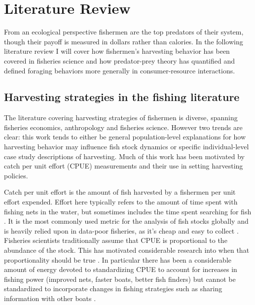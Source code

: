 \documentclass[12pt,a4paper]{report}
\begin{document}
\tableofcontents

\chapter{Literature Review}
From an ecological perspective fishermen are the top predators of their system, though their payoff is measured in dollars rather than calories. In the following literature review I will cover how fishermen's harvesting behavior has been covered in fisheries science and how predator-prey theory has quantified and defined foraging behaviors more generally in consumer-resource interactions. 

\section{Harvesting strategies in the fishing literature}
The literature covering harvesting strategies of fishermen is diverse, spanning fisheries economics, anthropology and fisheries science. However two trends are clear: this work tends to either be general population-level explanations for how harvesting behavior may influence fish stock dynamics or specific individual-level case study descriptions of harvesting. Much of this work has been motivated by catch per unit effort (CPUE) measurements and their use in setting harvesting policies. 

Catch per unit effort is the amount of fish harvested by a fishermen per unit effort expended. Effort here typically refers to the amount of time spent with fishing nets in the water, but sometimes includes the time spent searching for fish \citep{HilbornWalters:1992}. It is the most commonly used metric for the analysis of fish stocks globally and is heavily relied upon in data-poor fisheries, as it's cheap and easy to collect \citep{Paulyetal:2013}.  Fisheries scientists traditionally assume that CPUE is proportional to the abundance of the stock. This has motivated considerable research into when that proportionality should be true \citep{@Harleyetal:2001}. In particular there has been a considerable amount of energy devoted to standardizing CPUE to account for increases in fishing power (improved nets, faster boats, better fish finders) but cannot be standardized to incorporate changes in fishing strategies such as sharing information with other boats \citep{Branchetal:2006}.  
\end{document}
